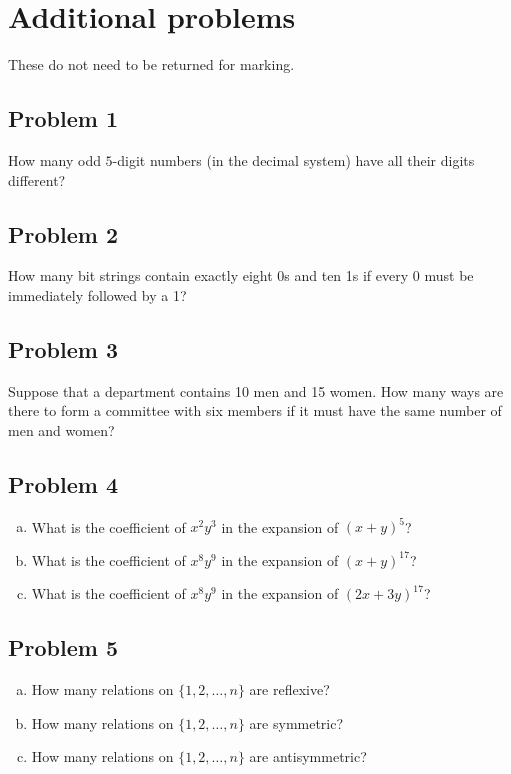 \documentclass{amsart}
\theoremstyle{definition} \newtheorem*{definition}{Definition}
\theoremstyle{remark} \newtheorem*{ex}{Example}
\begin{document}
\vspace{0.2in}

\section*{Additional problems}

These do not need to be returned for marking.

\subsection*{Problem 1}
How many odd $5$-digit numbers (in the decimal system) have all their digits different?

\subsection*{Problem 2}
How many bit strings contain exactly eight 0s and ten 1s if every 0 must be immediately followed by a 1?

\subsection*{Problem 3}
Suppose that a department contains 10 men and 15 women. How many ways are there to form a committee with six members if it must have the same number of men and women?

\subsection*{Problem 4}
\begin{enumerate}[a)]
\item What is the coefficient of $x^2 y^3$ in the expansion of $(x+y)^{5}$?
\item What is the coefficient of $x^8 y^9$ in the expansion of $(x+y)^{17}$?
\item What is the coefficient of $x^8 y^9$ in the expansion of $(2x+3y)^{17}$?
\end{enumerate}

\subsection*{Problem 5}
\begin{enumerate}[a)]
\item How many relations on $\{1,2,\dots ,n\}$ are reflexive?
\item How many relations on $\{1,2,\dots ,n\}$ are symmetric?
\item How many relations on $\{1,2,\dots ,n\}$ are antisymmetric?
\end{enumerate}
\end{document}
